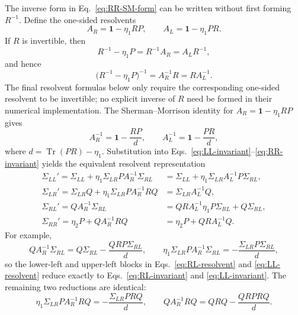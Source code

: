 \documentclass[aps,prb,onecolumn,nofootinbib,superscriptaddress]{revtex4-2}
\newcommand{\I}{\mathbf{1}}
\newcommand{\Tr}{\operatorname{Tr}}
\theoremstyle{plain}
\theoremstyle{definition}
\begin{document}
The inverse form in Eq.~\eqref{eq:RR-SM-form} can be written without first
forming \(R^{-1}\).  Define the one-sided resolvents
\begin{equation}
  A_R
  =
  \I-\eta_1RP,
  \qquad
  A_L
  =
  \I-\eta_1PR.
  \label{eq:one-sided-resolvents}
\end{equation}
If \(R\) is invertible, then
\begin{equation}
  R^{-1}-\eta_1P
  =
  R^{-1}A_R
  =
  A_LR^{-1},
  \label{eq:inverse-factorizations}
\end{equation}
and hence
\begin{equation}
  \bigl(R^{-1}-\eta_1P\bigr)^{-1}
  =
  A_R^{-1}R
  =
  RA_L^{-1}.
  \label{eq:resolvent-inverse-equivalence}
\end{equation}
The final resolvent formulas below only require the corresponding one-sided
resolvent to be invertible; no explicit inverse of \(R\) need be formed in
their numerical implementation.
The Sherman--Morrison identity for \(A_R=\I-\eta_1RP\) gives
\begin{equation}
  A_R^{-1}
  =
  \I-\frac{RP}{d},
  \qquad
  A_L^{-1}
  =
  \I-\frac{PR}{d},
  \label{eq:resolvent-SM-expanded}
\end{equation}
where \(d=\Tr(PR)-\eta_1\).  Substitution into
Eqs.~\eqref{eq:LL-invariant}--\eqref{eq:RR-invariant} yields the equivalent
resolvent representation
\begin{align}
  \boxed{
  \Sigma_{LL}'
  =
  \Sigma_{LL}
  +
  \eta_1\Sigma_{LR}P A_R^{-1}\Sigma_{RL}
  }
  &=
  \boxed{
  \Sigma_{LL}
  +
  \eta_1\Sigma_{LR}A_L^{-1}P\Sigma_{RL}
  },
  \label{eq:LL-resolvent}
  \\[5pt]
  \boxed{
  \Sigma_{LR}'
  =
  \Sigma_{LR}Q
  +
  \eta_1\Sigma_{LR}P A_R^{-1}RQ
  }
  &=
  \boxed{
  \Sigma_{LR}A_L^{-1}Q
  },
  \label{eq:LR-resolvent}
  \\[5pt]
  \boxed{
  \Sigma_{RL}'
  =
  Q A_R^{-1}\Sigma_{RL}
  }
  &=
  \boxed{
  QRA_L^{-1}\eta_1P\Sigma_{RL}
  +
  Q\Sigma_{RL}
  },
  \label{eq:RL-resolvent}
  \\[5pt]
  \boxed{
  \Sigma_{RR}'
  =
  \eta_2P
  +
  Q A_R^{-1}RQ
  }
  &=
  \boxed{
  \eta_2P
  +
  QRA_L^{-1}Q
  }.
  \label{eq:RR-resolvent}
\end{align}
For example,
\[
  Q A_R^{-1}\Sigma_{RL}
  =
  Q\Sigma_{RL}
  -
  \frac{QRP\Sigma_{RL}}{d},
  \qquad
  \eta_1\Sigma_{LR}P A_R^{-1}\Sigma_{RL}
  =
  -\frac{\Sigma_{LR}P\Sigma_{RL}}{d},
\]
so the lower-left and upper-left blocks in
Eqs.~\eqref{eq:RL-resolvent} and \eqref{eq:LL-resolvent} reduce exactly to
Eqs.~\eqref{eq:RL-invariant} and \eqref{eq:LL-invariant}.  The remaining
two reductions are identical:
\[
  \eta_1\Sigma_{LR}P A_R^{-1}RQ
  =
  -\frac{\Sigma_{LR}PRQ}{d},
  \qquad
  Q A_R^{-1}RQ
  =
  QRQ-\frac{QRPRQ}{d}.
\]
\end{document}
